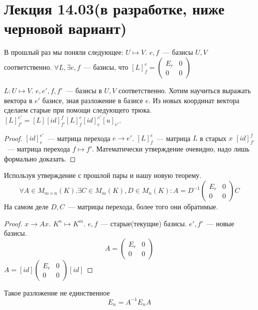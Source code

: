 \section{Лекция 14.03(в разработке, ниже черновой вариант)}
В прошлый раз мы поняли следующее:
$U\mapsto V$.
$e,f$~--- базисы $U, V$ соответственно.
$\forall L, \exists e,f$~--- базисы,
что $[L]_f^e=
\begin{pmatrix}
    E_r & 0\\
    0 & 0
\end{pmatrix}$

\begin{theorem}
    $L: U\mapsto V$. 
    $e, e', f, f'$~--- базисы в $U, V$ соответственно.
    Хотим научиться выражать вектора в $e'$ базисе, зная разложение
    в базисе $e$.
    Из новых координат вектора сделаем старые при помощи следующего трюка.
    $[L]^{e'}_{f'}=[L][id]_{f'}^{f}[L]_f^{e}[id]_e^{e'}[u]_{e'}$.
\end{theorem}
\begin{proof}
    $[id]_{e}^{e'}$~--- матрица перехода $e\rightarrow e'$.
    $[L]_f^e$~--- матрица $L$ в старых $x$
    $[id]_{f'}^f$~--- матрица перехода $f\mapsto f'$.
    Математически утверждение очевидно, надо лишь формально доказать.
\end{proof}
\begin{follow}
    Используя утверждение с прошлой пары и нашу новую теорему.
    $$\forall A\in M_{m\times n}(K).
    \exists C\in M_m(K), D\in M_n(K): A = D^{-1}
    \begin{pmatrix}
        E_r & 0\\
        0 & 0
    \end{pmatrix}C$$
    На самом деле $D, C$~--- матрицы перехода, более того они
    обратимые.
\end{follow}
\begin{proof}
    $x\rightarrow Ax$.
    $K^n\mapsto K^m$.
    $e, f$~--- старые(текущие) базисы.
    $e', f'$~--- новые базисы.
    $$A = \begin{pmatrix}
         E_r & 0\\
         0 & 0
        \end{pmatrix}
    $$
    $A = [id]\begin{pmatrix}
        E_r & 0\\
        0 & 0
    \end{pmatrix}[id]$
\end{proof}
\begin{remark}
    Такое разложение не единственное
    $$
    E_n = A^{-1}E_nA
    $$
\end{remark}
